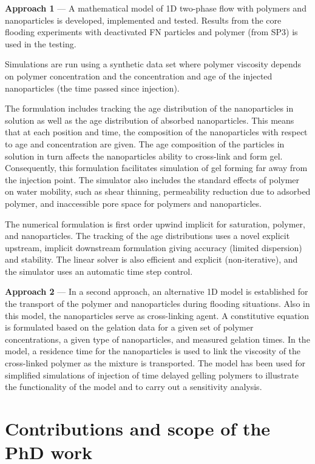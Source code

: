 \textbf{Approach 1} --- A mathematical model of 1D two-phase flow with polymers and nanoparticles is developed, implemented and tested. Results from the core flooding experiments with deactivated FN particles and polymer (from SP3) is used in the testing.

Simulations are run using a synthetic data set where polymer viscosity depends on polymer concentration and the concentration and age of the injected nanoparticles (the time passed since injection).

The formulation includes tracking the age distribution of the nanoparticles in solution as well as the age distribution of absorbed nanoparticles. This means that at each position and time, the composition of the nanoparticles with respect to age and concentration are given. The age composition of the particles in solution in turn affects the nanoparticles ability to cross-link and form gel. Consequently, this formulation facilitates simulation of gel forming far away from the injection point. The simulator also includes the standard effects of polymer on water mobility, such as shear thinning, permeability reduction due to adsorbed polymer, and inaccessible pore space for polymers and nanoparticles.

The numerical formulation is first order upwind implicit for saturation, polymer, and nanoparticles. The tracking of the age distributions uses a novel explicit upstream, implicit downstream formulation giving accuracy (limited dispersion) and stability. The linear solver is also efficient and explicit (non-iterative), and the simulator uses an automatic time step control. 

\textbf{Approach 2} --- In a second approach, an alternative 1D model is established for the transport of the polymer and nanoparticles during flooding situations. Also in this model, the nanoparticles serve as cross-linking agent. A constitutive equation is formulated based on the gelation data for a given set of polymer concentrations, a given type of nanoparticles, and measured gelation times. In the model, a residence time for the nanoparticles is used to link the viscosity of the cross-linked polymer as the mixture is transported. The model has been used for simplified simulations of injection of time delayed gelling polymers to illustrate the functionality of the model and to carry out a sensitivity analysis.

\section{Contributions and scope of the PhD work}

